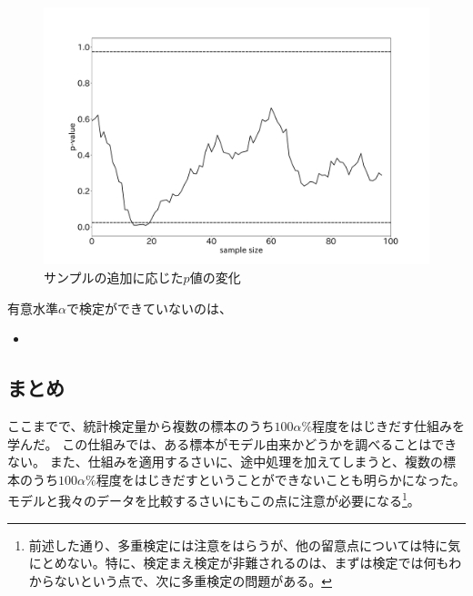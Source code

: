 \begin{figure}
  \begin{center}
    \includegraphics[width=15cm]{./image/04_/recurssive_test.pdf}
    \caption{サンプルの追加に応じた$p$値の変化}
        \label{fig:time_series_p_value}
    \end{center}
\end{figure}





有意水準$\alpha$で検定ができていないのは、
\begin{itemize}
  \item 
\end{itemize}
\fi

\subsection{まとめ}
ここまでで、統計検定量から複数の標本のうち$100\alpha\%$程度をはじきだす仕組みを学んだ。
この仕組みでは、ある標本がモデル由来かどうかを調べることはできない。
また、仕組みを適用するさいに、途中処理を加えてしまうと、複数の標本のうち$100\alpha\%$程度をはじきだすということができないことも明らかになった。
モデルと我々のデータを比較するさいにもこの点に注意が必要になる\footnote{前述した通り、多重検定には注意をはらうが、他の留意点については特に気にとめない。特に、検定まえ検定が非難されるのは、まずは検定では何もわからないという点で、次に多重検定の問題がある。}。

